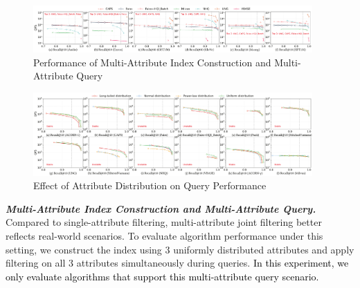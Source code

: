 \documentclass[sigconf, nonacm, pdfa]{acmart}
\begin{document}
{	
	
	\begin{figure}
		\centering
		\setlength{\abovecaptionskip}{0.15cm}
		\setlength{\belowcaptionskip}{-0.10cm}
		\includegraphics[width=0.95\textwidth]{figures/exp/exp_4_1_MultiLabel_1thread.pdf}
		\caption{Performance of Multi-Attribute Index Construction and Multi-Attribute Query}
		\label{fig:exp_4_1_MultiLabel_1thread}
	\end{figure}
	
	
	\begin{figure}
	\centering
	\setlength{\abovecaptionskip}{0.1cm}
	\setlength{\belowcaptionskip}{-0.25cm}
	\includegraphics[width=0.95\textwidth]{figures/exp/exp_3_1.pdf}
	\caption{
		Effect of Attribute Distribution on Query Performance}
		
	\label{fig:exp_3_1}

	\end{figure}
	
	
	
	
	
	\textit{\textbf{Multi-Attribute Index Construction and Multi-Attribute Query.}}  
	Compared to single-attribute filtering, multi-attribute joint filtering better reflects real-world scenarios. To evaluate algorithm performance under this setting, we construct the index using 3 uniformly distributed attributes and apply filtering on all 3 attributes simultaneously during queries. \textcolor{black}{In this experiment, we only evaluate algorithms that support this multi-attribute query scenario.}
	
}
\end{document}
